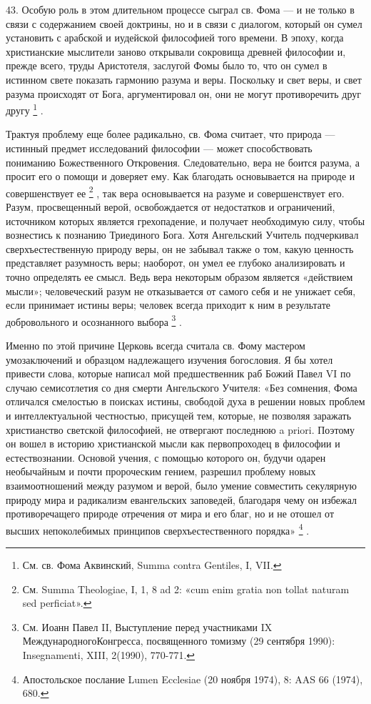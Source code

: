 \documentclass[a5paper,10pt]{article}
\begin{document}
43. Особую роль в этом длительном процессе сыграл св. Фома — и не только в
связи с содержанием своей доктрины, но и в связи с диалогом, который он сумел
установить с арабской и иудейской философией того времени. В эпоху, когда
христианские мыслители заново открывали сокровища древней философии и, прежде
всего, труды Аристотеля, заслугой Фомы было то, что он сумел в истинном свете
показать гармонию разума и веры. Поскольку и свет веры, и свет разума
происходят от Бога, аргументировал он, они не могут противоречить друг другу
\footnote{См. св. Фома Аквинский, Summa contra Gentiles, I, VII.} .

Трактуя проблему еще более радикально, св. Фома считает, что природа — истинный
предмет исследований философии — может способствовать пониманию Божественного
Откровения. Следовательно, вера не боится разума, а просит его о помощи и
доверяет ему. Как благодать основывается на природе и совершенствует ее
\footnote{См. Summa Theologiae, I, 1, 8 ad 2: «cum enim gratia non tollat
naturam sed perficiat».} , так вера основывается на разуме и совершенствует
его. Разум, просвещенный верой, освобождается от недостатков и ограничений,
источником которых является грехопадение, и получает необходимую силу, чтобы
вознестись к познанию Триединого Бога. Хотя Ангельский Учитель подчеркивал
сверхъестественную природу веры, он не забывал также о том, какую ценность
представляет разумность веры; наоборот, он умел ее глубоко анализировать и
точно определять ее смысл. Ведь вера некоторым образом является «действием
мысли»; человеческий разум не отказывается от самого себя и не унижает себя,
если принимает истины веры; человек всегда приходит к ним в результате
добровольного и осознанного выбора \footnote{См. Иоанн Павел II, Выступление
    перед участниками IX МеждународногоКонгресса, посвященного томизму (29
сентября 1990): Insegnamenti, XIII, 2(1990), 770-771.} .

Именно по этой причине Церковь всегда считала св. Фому мастером умозаключений и
образцом надлежащего изучения богословия. Я бы хотел привести слова, которые
написал мой предшественник раб Божий Павел VI по случаю семисотлетия со дня
смерти Ангельского Учителя: «Без сомнения, Фома отличался смелостью в поисках
истины, свободой духа в решении новых проблем и интеллектуальной честностью,
присущей тем, которые, не позволяя заражать христианство светской философией,
не отвергают последнюю a priori. Поэтому он вошел в историю христианской мысли
как первопроходец в философии и естествознании. Основой учения, с помощью
которого он, будучи одарен необычайным и почти пророческим гением, разрешил
проблему новых взаимоотношений между разумом и верой, было умение совместить
секулярную природу мира и радикализм евангельских заповедей, благодаря чему он
избежал противоречащего природе отречения от мира и его благ, но и не отошел от
высших непоколебимых принципов сверхъестественного порядка»
\footnote{Апостольское послание Lumen Ecclesiae (20 ноября 1974), 8: AAS 66
(1974), 680.}  .
\end{document}
